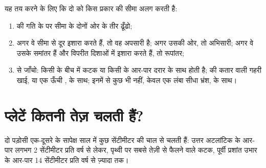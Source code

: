 \begin{method}[मानचित्र पर प्लेट सीमा पहचानना]\label{met:g7:plate-tectonics:recognise}
यह तय करने के लिए कि दो  को किस प्रकार की सीमा अलग करती है:
\begin{enumerate}
  \item {} की गति के  पर सीमा के दोनों ओर के तीर
        ढूँढो;
  \item अगर वे सीमा से दूर इशारा करते हैं, तो वह अपसारी है; अगर उसकी ओर, तो
        अभिसारी; अगर वे उसके समांतर हैं और विपरीत दिशाओं में इशारा करते हैं,
        तो रूपांतर;
  \item {} से जाँचो: किसी  के बीच में कटक या किसी  के
        आर-पार दरार   के साथ होती है;  की कतार वाली
        गहरी खाई, या एक ऊँची ,  के साथ; इनमें से कुछ भी
        नहीं, केवल एक लंबा सीधा भ्रंश,  के
        साथ।
\end{enumerate}
\end{method}

\section{प्लेटें कितनी तेज़ चलती हैं?}

\begin{proposition}[साल में कुछ सेंटीमीटर]\label{prop:g7:plate-tectonics:speed}
दो पड़ोसी  एक-दूसरे के सापेक्ष साल में कुछ सेंटीमीटर की चाल से चलती
हैं: उत्तर अटलांटिक के आर-पार लगभग 2 सेंटीमीटर प्रति वर्ष से लेकर, पृथ्वी पर
सबसे तेज़ी से फैलने वाले कटक, पूर्वी प्रशांत उभार के आर-पार 14 सेंटीमीटर प्रति
वर्ष से ज़्यादा तक।
\end{proposition}


